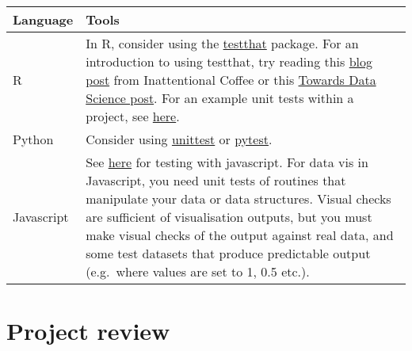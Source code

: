 \documentclass[]{book}
\begin{document}
\begin{longtable}[]{@{}ll@{}}
\toprule
\begin{minipage}[b]{0.21\columnwidth}\raggedright
Language\strut
\end{minipage} & \begin{minipage}[b]{0.73\columnwidth}\raggedright
Tools\strut
\end{minipage}\tabularnewline
\midrule
\endhead
\begin{minipage}[t]{0.21\columnwidth}\raggedright
R\strut
\end{minipage} & \begin{minipage}[t]{0.73\columnwidth}\raggedright
In R, consider using the \href{https://github.com/r-lib/testthat}{testthat} package. For an introduction to using testthat, try reading this \href{https://katherinemwood.github.io/post/testthat/}{blog post} from Inattentional Coffee or this \href{https://towardsdatascience.com/unit-testing-in-r-68ab9cc8d211}{Towards Data Science post}. For an example unit tests within a project, see \href{https://github.com/RobinL/costmodelr/tree/master/tests}{here}.\strut
\end{minipage}\tabularnewline
\begin{minipage}[t]{0.21\columnwidth}\raggedright
Python\strut
\end{minipage} & \begin{minipage}[t]{0.73\columnwidth}\raggedright
Consider using \href{https://docs.python.org/3/library/unittest.html}{unittest} or \href{https://docs.pytest.org/en/latest/}{pytest}.\strut
\end{minipage}\tabularnewline
\begin{minipage}[t]{0.21\columnwidth}\raggedright
Javascript\strut
\end{minipage} & \begin{minipage}[t]{0.73\columnwidth}\raggedright
See \href{http://busypeoples.github.io/post/testing-d3-with-jasmine/}{here} for testing with javascript. For data vis in Javascript, you need unit tests of routines that manipulate your data or data structures. Visual checks are sufficient of visualisation outputs, but you must make visual checks of the output against real data, and some test datasets that produce predictable output (e.g.~where values are set to 1, 0.5 etc.).\strut
\end{minipage}\tabularnewline
\bottomrule
\end{longtable}

\hypertarget{review}{%
\section{Project review}\label{review}}
\end{document}
